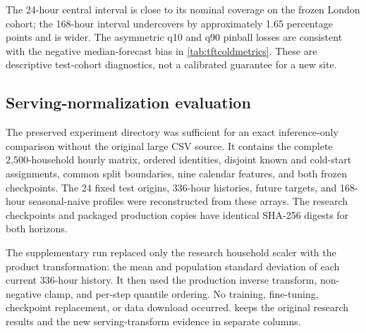 The 24-hour central interval is close to its nominal coverage on the frozen London cohort; the 168-hour interval undercovers by approximately 1.65 percentage points and is wider. The asymmetric q10 and q90 pinball losses are consistent with the negative median-forecast bias in \cref{tab:tftcoldmetrics}. These are descriptive test-cohort diagnostics, not a calibrated guarantee for a new site.

\subsection{Serving-normalization evaluation}

The preserved experiment directory was sufficient for an exact inference-only comparison without the original large CSV source. It contains the complete 2,500-household hourly matrix, ordered identities, disjoint known and cold-start assignments, common split boundaries, nine calendar features, and both frozen checkpoints. The 24 fixed test origins, 336-hour histories, future targets, and 168-hour seasonal-naive profiles were reconstructed from these arrays. The research checkpoints and packaged production copies have identical SHA-256 digests for both horizons.

The supplementary run replaced only the research household scaler with the product transformation: the mean and population standard deviation of each current 336-hour history. It then used the production inverse transform, non-negative clamp, and per-step quantile ordering. No training, fine-tuning, checkpoint replacement, or data download occurred.  keeps the original research results and the new serving-transform evidence in separate columns.

